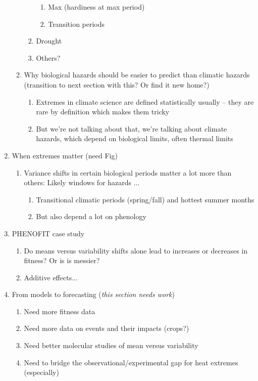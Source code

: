\documentclass[11pt,letter]{article}
\begin{document}
\begin{enumerate}
\begin{enumerate}
\begin{enumerate}
\begin{enumerate}
\item Max (hardiness at max period) 
\item Transition periods
\end{enumerate}
\item Drought
\item Others?
\end{enumerate}
\item Why biological hazards should be easier to predict than climatic hazards (transition to next section with this? Or find it new home?)
\begin{enumerate}
\item Extremes in climate science are defined statistically usually -- they are rare by definition which makes them tricky
\item But we're not talking about that, we're talking about climate hazards, which depend on biological limits, often thermal limits
\end{enumerate}
\end{enumerate}
\item When extremes matter (need Fig)
\begin{enumerate}
\item Variance shifts in certain biological periods matter a lot more than others: Likely windows for hazards ...
\begin{enumerate}
\item Transitional climatic periods (spring/fall) and hottest summer months
\item But also depend a lot on phenology 
\end{enumerate}
\end{enumerate}
\item PHENOFIT case study
\begin{enumerate}
\item Do means versus variability shifts alone lead to increases or decreases in fitness? Or is is messier?
\item Additive effects... 
\end{enumerate}
\item From models to forecasting (\emph{this section needs work})
\begin{enumerate}
\item Need more fitness data
\item Need more data on events and their impacts (crops?)
\item Need better molecular studies of mean versus variability 
\item Need to bridge the observational/experimental gap for heat extremes (especially)
\end{enumerate}
\end{enumerate}
\end{document}

